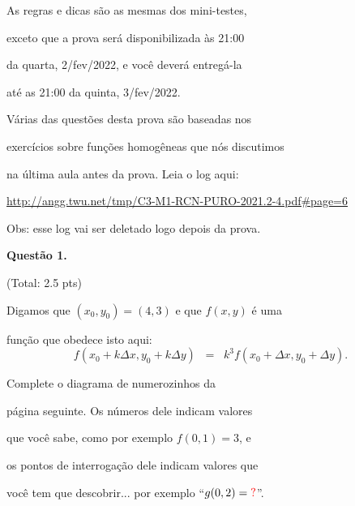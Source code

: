 \documentclass[oneside,12pt]{article}
\begin{document}

As regras e dicas são as mesmas dos mini-testes,

exceto que a prova será disponibilizada às 21:00

da quarta, 2/fev/2022, e você deverá entregá-la

até as 21:00 da quinta, 3/fev/2022.

\msk

Várias das questões desta prova são baseadas nos

exercícios sobre funções homogêneas que nós discutimos

na última aula antes da prova. Leia o log aqui:

\msk

{\footnotesize

\url{http://angg.twu.net/tmp/C3-M1-RCN-PURO-2021.2-4.pdf\#page=6}

}

\msk

Obs: esse log vai ser deletado logo depois da prova.

\newpage

{\bf Questão 1.}

\T(Total: 2.5 pts)

Digamos que $(x_0,y_0)=(4,3)$ e que $f(x,y)$ é uma

função que obedece isto aqui:
%
$$f(x_0+kΔx, y_0+kΔy) \;\;=\;\; k^3 f(x_0+Δx, y_0+Δy).$$

Complete o diagrama de numerozinhos da

página seguinte. Os números dele indicam valores

que você sabe, como por exemplo $f(0,1)=3$, e

os pontos de interrogação dele indicam valores que

você tem que descobrir... por exemplo ``$g(0,2)=\ColorRed{?}$''.


\newpage

\unitlength=8pt
\celllower=2.5pt
\def\cellfont{\scriptsize}
\def\cellfont{\footnotesize}

\unitlength=20pt

\pu
\end{document}
